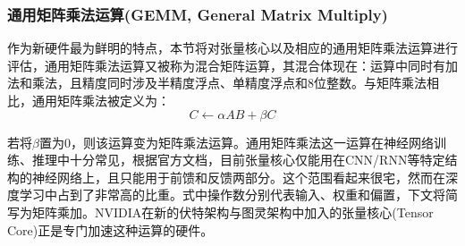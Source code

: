 \subsubsection{通用矩阵乘法运算(GEMM, General Matrix Multiply)}
\par 作为新硬件最为鲜明的特点，本节将对张量核心以及相应的通用矩阵乘法运算进行评估，通用矩阵乘法运算又被称为混合矩阵运算，其混合体现在：运算中同时有加法和乘法，且精度同时涉及半精度浮点、单精度浮点和8位整数。与矩阵乘法相比，通用矩阵乘法被定义为：
$$ C \leftarrow \alpha AB + \beta C $$
\par 若将$ \beta $置为0，则该运算变为矩阵乘法运算。通用矩阵乘法这一运算在神经网络训练、推理中十分常见，根据官方文档，目前张量核心仅能用在CNN/RNN等特定结构的神经网络上，且只能用于前馈和反馈两部分。这个范围看起来很宅，然而在深度学习中占到了非常高的比重。式中操作数分别代表输入、权重和偏置，下文将简写为矩阵乘加。NVIDIA在新的伏特架构与图灵架构中加入的张量核心(Tensor Core)正是专门加速这种运算的硬件。
